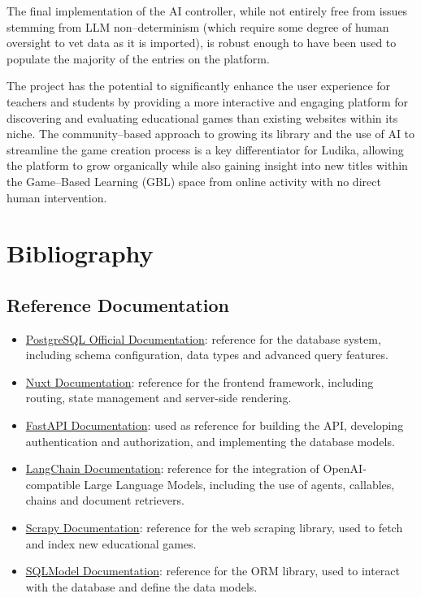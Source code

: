 \documentclass[11pt,italian,a4paper]{article}
\begin{document}
The final implementation of the AI controller, while not entirely free from issues stemming from LLM non--determinism (which require some degree of human oversight to vet data as it is imported), is robust enough to have been used to populate the majority of the entries on the platform.

The project has the potential to significantly enhance the user experience for teachers and students by providing a more interactive and engaging platform for discovering and evaluating educational games than existing websites within its niche. The community--based approach to growing its library and the use of AI to streamline the game creation process is a key differentiator for Ludika, allowing the platform to grow organically while also gaining insight into new titles within the Game--Based Learning (GBL) space from online activity with no direct human intervention.

\pagebreak
\section{Bibliography}

\subsection{Reference Documentation}
\begin{itemize}
    \item \href{https://www.postgresql.org/docs/current/}{PostgreSQL Official Documentation}: reference for the database system, including schema configuration, data types and advanced query features.
    \item \href{https://nuxt.com/docs/getting-started/introduction}{Nuxt Documentation}: reference for the frontend framework, including routing, state management and server-side rendering.
    \item \href{https://fastapi.tiangolo.com/tutorial/}{FastAPI Documentation}: used as reference for building the API, developing authentication and authorization, and implementing the database models.
    \item \href{https://langchain.com/docs/get_started/introduction.html}{LangChain Documentation}: reference for the integration of OpenAI-compatible Large Language Models, including the use of agents, callables, chains and document retrievers.
    \item \href{https://scrapy.org/doc/en/latest/}{Scrapy Documentation}: reference for the web scraping library, used to fetch and index new educational games.
    \item \href{https://sqlmodel.tiangolo.com/}{SQLModel Documentation}: reference for the ORM library, used to interact with the database and define the data models.
\end{itemize}
\end{document}
